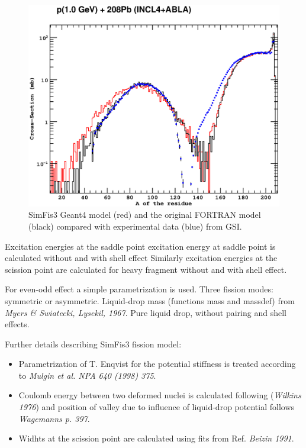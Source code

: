 \begin{figure}
\begin{center}
\includegraphics[scale=0.65]{fragments.eps}
\end{center}
\caption{{\sf SimFis3} Geant4 model (red) and the original FORTRAN
  model (black) compared with experimental data (blue) from GSI.}
\label{fig:fragments}
\end{figure}


Excitation energies at the saddle point excitation energy at saddle
point is calculated without and with shell effect Similarly excitation
energies at the scission point are calculated for heavy fragment
without and with shell effect.


For even-odd effect a simple parametrization is used.  Three fission
modes: symmetric or asymmetric.  Liquid-drop mass (functions mass and
massdef) from \emph{Myers \& Swiatecki, Lysekil, 1967}. Pure liquid
drop, without pairing and shell effects.

Further details describing {\sf SimFis3} fission model:
\begin{itemize}
\item Parametrization of T. Enqvist for the potential stiffness is
  treated according to \emph{Mulgin et al. NPA 640 (1998) 375}.
\item Coulomb energy between two deformed nuclei is calculated
  following (\emph{Wilkins 1976}) and position of valley due to
  influence of liquid-drop potential follows \emph{Wagemanns p. 397}.
\item Widhts at the scission point are calculated using fits from
  Ref. \emph{Beizin 1991}. %
\end{itemize}

